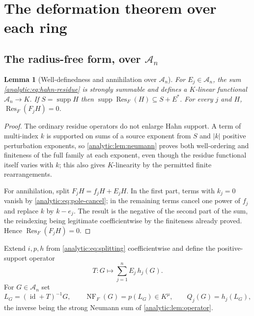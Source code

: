 \documentclass[11pt,letterpaper]{article}
\newtheorem{lemma}[theorem]{Lemma}
\theoremstyle{definition}
\theoremstyle{remark}
\newcommand{\A}{\mathscr A}
\newcommand{\Res}{\operatorname{Res}}
\newcommand{\supp}{\operatorname{supp}}
\newcommand{\id}{\operatorname{id}}
\newcommand{\NF}{\operatorname{NF}}
\numberwithin{equation}{section}
\begin{document}
\section{The deformation theorem over each ring}\label{analytic:sec:deform}

\subsection{The radius-free form, over $\A_n$}
\label{analytic:subsec:deformA}
\begin{lemma}[Well-definedness and annihilation over $\A_n$]
\label{analytic:lem:residue-annihilate}
For $E_j\in\A_n$, the sum \eqref{analytic:eq:hahn-residue} is strongly
summable and defines a $K$-linear functional $\A_n\to K$. If $S=\supp H$
then $\supp\Res_F(H)\subseteq S+E^*$. For every $j$ and $H$,
$\Res_F(F_jH)=0$.
\end{lemma}
\begin{proof}
The ordinary residue operators do not enlarge Hahn support. A term of
multi-index $k$ is supported on sums of a source exponent from $S$ and
$|k|$ positive perturbation exponents, so \cref{analytic:lem:neumann}
proves both well-ordering and finiteness of the full family at each
exponent, even though the residue functional itself varies with $k$; this
also gives $K$-linearity by the permitted finite rearrangements.

For annihilation, split $F_jH=f_jH+E_jH$. In the first part, terms with
$k_j=0$ vanish by \eqref{analytic:eq:pole-cancel}; in the remaining terms
cancel one power of $f_j$ and replace $k$ by $k-e_j$. The result is the
negative of the second part of the sum, the reindexing being legitimate
coefficientwise by the finiteness already proved. Hence $\Res_F(F_jH)=0$.
\end{proof}

Extend $i,p,h$ from \eqref{analytic:eq:splitting} coefficientwise and define
the positive-support operator
\begin{equation}\label{analytic:eq:T}
 T:G\longmapsto\sum_{j=1}^nE_j\,h_j(G).
\end{equation}
For $G\in\A_n$ set
\begin{equation}\label{analytic:eq:normal-form}
 L_G=(\id+T)^{-1}G,\qquad
 \NF_F(G)=p(L_G)\in K^\mu,\qquad
 Q_j(G)=h_j(L_G),
\end{equation}
the inverse being the strong Neumann sum of
\cref{analytic:lem:operator}.
\end{document}
